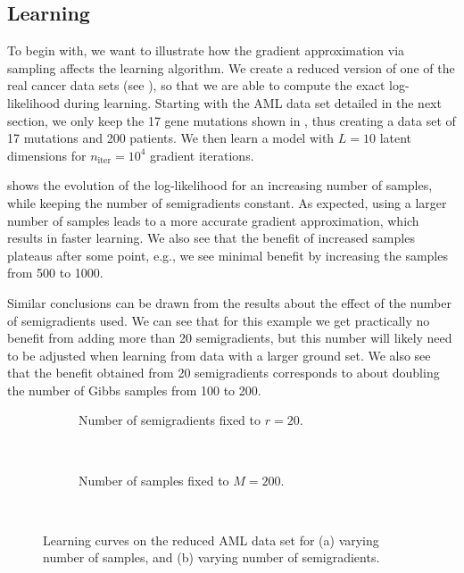 \subsection{Learning}
To begin with, we want to illustrate how the gradient approximation via sampling affects the learning algorithm.
We create a reduced version of one of the real cancer data sets (see ), so that we are able to compute the exact log-likelihood during learning.
Starting with the AML data set detailed in the next section, we only keep the 17 gene mutations shown in , thus creating a data set of 17 mutations and 200 patients.
We then learn a \fldc{} model with $L = 10$ latent dimensions for $n_{\mathrm{iter}} = 10^4$ gradient iterations.

 shows the evolution of the log-likelihood for an increasing number of samples, while keeping the number of semigradients constant.
As expected, using a larger number of samples leads to a more accurate gradient approximation, which results in faster learning.
We also see that the benefit of increased samples plateaus after some point, e.g., we see minimal benefit by increasing the samples from 500 to 1000.

Similar conclusions can be drawn from the results  about the effect of the number of semigradients used.
We can see that for this example we get practically no benefit from adding more than 20 semigradients, but this number will likely need to be adjusted when learning from data with a larger ground set.
We also see that the benefit obtained from 20 semigradients corresponds to about doubling the number of Gibbs samples from 100 to 200.

\setlength{}
\setlength{}
\renewcommand{\subflen}{\textwidth}
\begin{figure}[htbp]
  \centering
  \begin{subfigure}[b]{\subflen}
    \centering
    
    \caption{Number of semigradients fixed to $r = 20$.}
    \label{fig:syn_nsamples}
  \end{subfigure}\\[2em]
  \begin{subfigure}[b]{\subflen}
    \centering
    
    \caption{Number of samples fixed to $M = 200$.}
    \label{fig:syn_nsubg}
  \end{subfigure}\\[1em]
  \caption{
    Learning curves on the reduced AML data set for (a) varying number of samples, and (b) varying number of semigradients.
  }
  \label{fig:syn1}
\end{figure}

